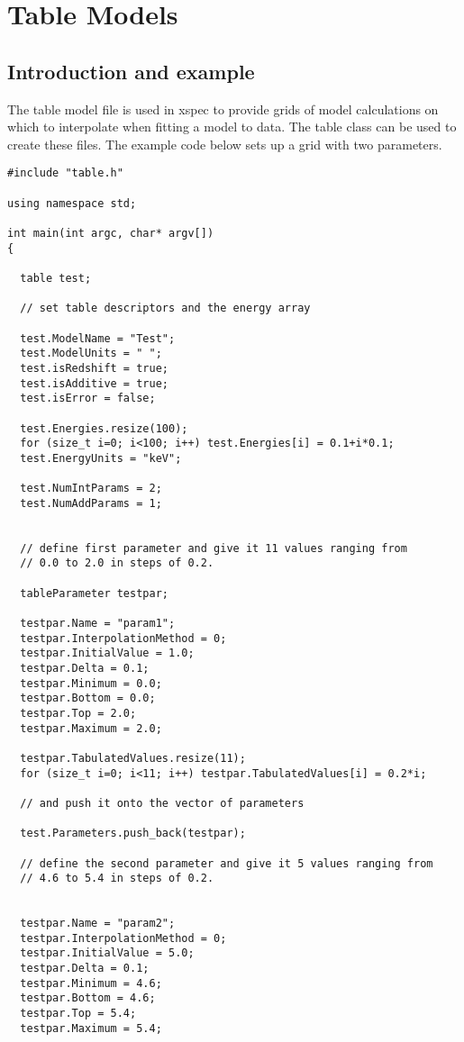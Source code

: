 \documentclass[11pt]{book}
\begin{document}
\section{Table Models}

\subsection{Introduction and example}

The table model file is used in xspec to provide grids of model
calculations on which to interpolate when fitting a model to data. The
table class can be used to create these files. The example code below
sets up a grid with two parameters.

\begin{verbatim}
#include "table.h"

using namespace std;

int main(int argc, char* argv[])
{

  table test;

  // set table descriptors and the energy array

  test.ModelName = "Test";
  test.ModelUnits = " ";
  test.isRedshift = true;
  test.isAdditive = true;
  test.isError = false;

  test.Energies.resize(100);
  for (size_t i=0; i<100; i++) test.Energies[i] = 0.1+i*0.1;
  test.EnergyUnits = "keV";

  test.NumIntParams = 2;
  test.NumAddParams = 1;


  // define first parameter and give it 11 values ranging from
  // 0.0 to 2.0 in steps of 0.2.

  tableParameter testpar;

  testpar.Name = "param1";
  testpar.InterpolationMethod = 0;
  testpar.InitialValue = 1.0;
  testpar.Delta = 0.1;
  testpar.Minimum = 0.0;
  testpar.Bottom = 0.0;
  testpar.Top = 2.0;
  testpar.Maximum = 2.0;

  testpar.TabulatedValues.resize(11);
  for (size_t i=0; i<11; i++) testpar.TabulatedValues[i] = 0.2*i;

  // and push it onto the vector of parameters

  test.Parameters.push_back(testpar);

  // define the second parameter and give it 5 values ranging from
  // 4.6 to 5.4 in steps of 0.2.


  testpar.Name = "param2";
  testpar.InterpolationMethod = 0;
  testpar.InitialValue = 5.0;
  testpar.Delta = 0.1;
  testpar.Minimum = 4.6;
  testpar.Bottom = 4.6;
  testpar.Top = 5.4;
  testpar.Maximum = 5.4;


\end{verbatim}
\end{document}
